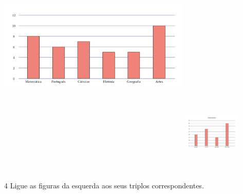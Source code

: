 \begin{escolha}
\begin{escolha}
\includegraphics[width=3.60298in,height=5.04167in]{media/image100.png}
\includegraphics[width=1.10824in,height=1.56250in]{media/image101.png}

\num{4} Ligue as figuras da esquerda aos seus triplos correspondentes.



\end{escolha}
\end{escolha}
